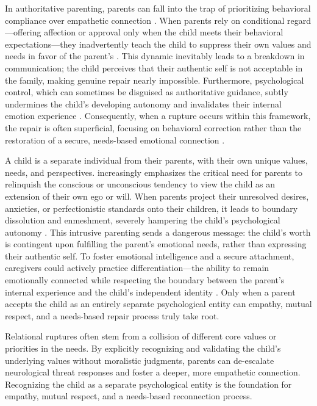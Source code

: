 In authoritative parenting, parents can fall into the trap of prioritizing behavioral compliance over empathetic connection \citep{kohn2005}.
When parents rely on conditional regard---offering affection or approval only when the child meets their behavioral expectations---they inadvertently teach the child to suppress their own values and needs in favor of the parent's \citep{assor2004}.
This dynamic inevitably leads to a breakdown in communication; the child perceives that their authentic self is not acceptable in the family, making genuine repair nearly impossible.
Furthermore, psychological control, which can sometimes be disguised as authoritative guidance, subtly undermines the child's developing autonomy and invalidates their internal emotion experience \citep{soenens2010}.
Consequently, when a rupture occurs within this framework, the repair is often superficial, focusing on behavioral correction rather than the restoration of a secure, needs-based emotional connection \citep{joussemet2008}.

A child is a separate individual from their parents, with their own unique values, needs, and perspectives.
\citet{barber2025} increasingly emphasizes the critical need for parents to relinquish the conscious or unconscious tendency to view the child as an extension of their own ego or will.
When parents project their unresolved desires, anxieties, or perfectionistic standards onto their children, it leads to boundary dissolution and enmeshment, severely hampering the child's psychological autonomy \citep{kerig2024}.
This intrusive parenting sends a dangerous message: the child's worth is contingent upon fulfilling the parent's emotional needs, rather than expressing their authentic self.
To foster emotional intelligence and a secure attachment, caregivers could actively practice differentiation---the ability to remain emotionally connected while respecting the boundary between the parent's internal experience and the child's independent identity \citep{soenens2026}.
Only when a parent accepts the child as an entirely separate psychological entity can empathy, mutual respect, and a needs-based repair process truly take root.
\begin{keyinsight}
Relational ruptures often stem from a collision of different core values or priorities in the needs.
By explicitly recognizing and validating the child's underlying values without moralistic judgments, parents can de-escalate neurological threat responses and foster a deeper, more empathetic connection.
Recognizing the child as a separate psychological entity is the foundation for empathy, mutual respect, and a needs-based reconnection process.
\end{keyinsight}

